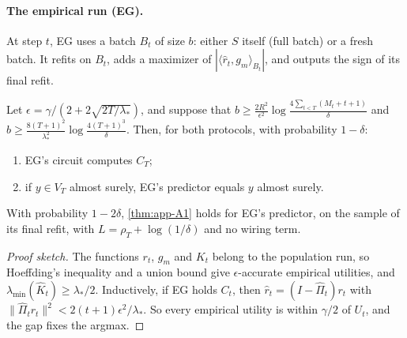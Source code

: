 \paragraph{The empirical run (EG).} At step $t$, EG uses a batch $B_t$ of size $b$: either $S$ itself (full batch) or a fresh batch. It refits on $B_t$, adds a maximizer of $|\langle\hat r_t,g_m\rangle_{B_t}|$, and outputs the sign of its final refit.

\begin{theorem}\label{thm:app-A31}
\quad Let $\epsilon=\gamma/(2+2\sqrt{2T/\lambda_*})$, and suppose that $b\ge\frac{2R^2}{\epsilon^2}\log\frac{4\sum_{t<T}(M_t+t+1)}{\delta}$ and $b\ge\frac{8(T+1)^2}{\lambda_*^2}\log\frac{4(T+1)^3}{\delta}$. Then, for both protocols, with probability $1-\delta$:
\begin{enumerate}[label=(\arabic*),nosep]
\item EG's circuit computes $C_T$;
\item if $y\in V_T$ almost surely, EG's predictor equals $y$ almost surely.
\end{enumerate}
With probability $1-2\delta$, \cref{thm:app-A1} holds for EG's predictor, on the sample of its final refit, with $L=\rho_T+\log(1/\delta)$ and no wiring term.
\end{theorem}
\begin{proof}[Proof sketch]
The functions $r_t$, $g_m$ and $K_t$ belong to the population run, so Hoeffding's inequality and a union bound give $\epsilon$-accurate empirical utilities, and $\lambda_{\min}(\hat K_t)\ge\lambda_*/2$. Inductively, if EG holds $C_t$, then $\hat r_t=(I-\hat\Pi_t)r_t$ with $\|\hat\Pi_tr_t\|^2<2(t+1)\epsilon^2/\lambda_*$. So every empirical utility is within $\gamma/2$ of $U_t$, and the gap fixes the argmax.
\end{proof}

